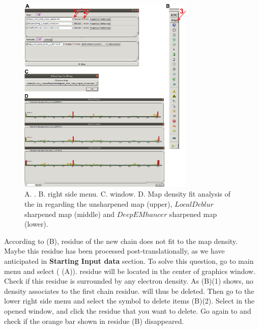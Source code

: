  \begin{figure}[H]
  \centering 
  \captionsetup{width=.9\linewidth} 
  \includegraphics[width=0.75\textwidth]{Images/Fig25}
  \caption{A. \coot {}. B. \coot right side menu. C. \coot {} window. D. Map density fit analysis of the  in \coot regarding the unsharpened map (upper), $LocalDeblur$ sharpened map (middle) and $DeepEMhancer$ sharpened map (lower).}
  \label{fig:coot_density_fit_analysis}
  \end{figure}
  
  According to  (B),  residue of the new chain  does not fit to the map density. Maybe this residue has been processed post-translationally, as we have anticipated in \textbf{Starting Input data} section. To solve this question, go to \coot main menu and select  ( (A)).  residue will be located in the center of \coot graphics window. Check if this residue is surrounded by any electron density. As  (B)(1) shows, no density associates to the first chain residue.  will thus be deleted. Then go to the lower right side menu and select the symbol to delete items (B)(2). Select  in the opened  window, and click the  residue that you want to delete. Go again to  and check if the orange bar shown in  residue  (B) disappeared.
  
